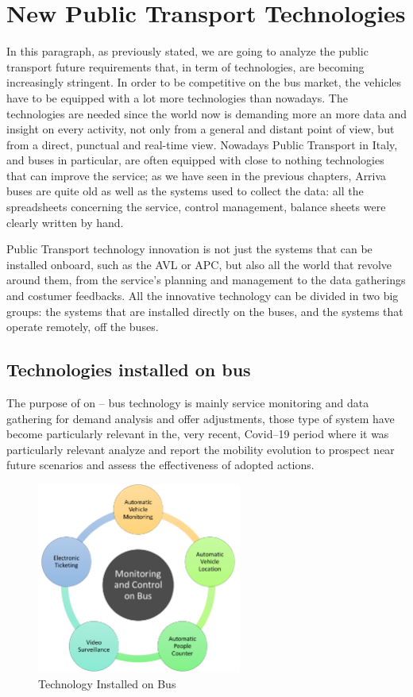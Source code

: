 \section{New Public Transport Technologies}
\label{sec:newtech}
In this paragraph, as previously stated, we are going to analyze the public transport future requirements that, in term of technologies, are becoming increasingly stringent. In order to be competitive on the bus market, the vehicles have to be equipped with a lot more technologies than nowadays. The technologies are needed since the world now is demanding more an more data and insight on every activity, not only from a general and distant point of view, but from a direct, punctual and real-time view. Nowadays Public Transport in Italy, and buses in particular, are often equipped with close to nothing technologies that can improve the service; as we have seen in the previous chapters, Arriva buses are quite old as well as the systems used to collect the data: all the spreadsheets concerning the service, control management, balance sheets were clearly written by hand.

Public Transport technology innovation is not just the systems that can be installed onboard, such as the AVL or APC, but also all the world that revolve around them, from the service’s planning and management to the data gatherings and costumer feedbacks. All the innovative technology can be divided in two big groups: the systems that are installed directly on the buses, and the systems that operate remotely, off the buses.


\subsection{Technologies installed on bus}
\label{subsec:techonbus}
The purpose of on – bus technology is mainly service monitoring and data gathering for demand analysis and offer adjustments, those type of system have become particularly relevant in the, very recent, Covid–19 period where it was particularly relevant analyze and report the mobility evolution to prospect near future scenarios and assess the effectiveness of adopted actions.

\begin{figure}[h!]
    \centering
    \includegraphics[width=0.6\textwidth]{Images/New Technologies/immagine intro Tech On.png}
    \caption{Technology Installed on Bus}
    \label{fig:onbus}
\end{figure}

